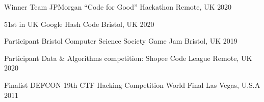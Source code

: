 



\begin{cvhonors}

  \cvhonor
    {Winner Team} %
    {JPMorgan “Code for Good” Hackathon} %
    {Remote, UK} %
    {2020} %

  \cvhonor
    {51st in UK} %
    {Google Hash Code} %
    {Bristol, UK} %
    {2020} %

  \cvhonor
    {Participant} %
    {Bristol Computer Science Society Game Jam} %
    {Bristol, UK} %
    {2019} %

  \cvhonor
    {Participant} %
    {Data \& Algorithms competition: Shopee Code League} %
    {Remote, UK} %
    {2020} %

  \cvhonor
    {Finalist} %
    {DEFCON 19th CTF Hacking Competition World Final} %
    {Las Vegas, U.S.A} %
    {2011} %

\end{cvhonors}





